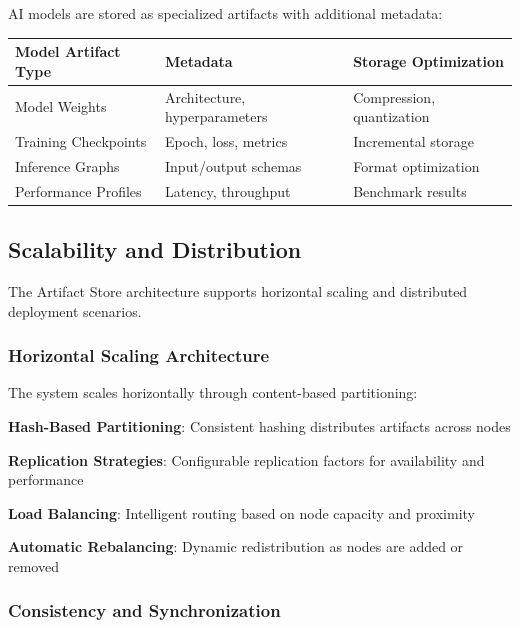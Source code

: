 AI models are stored as specialized artifacts with additional metadata:

\begin{center}
\begin{tabular}{@{}lll@{}}
\toprule
\textbf{Model Artifact Type} & \textbf{Metadata} & \textbf{Storage Optimization} \\
\midrule
Model Weights & Architecture, hyperparameters & Compression, quantization \\
Training Checkpoints & Epoch, loss, metrics & Incremental storage \\
Inference Graphs & Input/output schemas & Format optimization \\
Performance Profiles & Latency, throughput & Benchmark results \\
\bottomrule
\end{tabular}
\end{center}

\subsection*{Scalability and Distribution}

The Artifact Store architecture supports horizontal scaling and distributed deployment scenarios.

\subsubsection*{Horizontal Scaling Architecture}

The system scales horizontally through content-based partitioning:

\begin{expandedlist}
    \item \textbf{Hash-Based Partitioning}: Consistent hashing distributes artifacts across nodes
    \item \textbf{Replication Strategies}: Configurable replication factors for availability and performance
    \item \textbf{Load Balancing}: Intelligent routing based on node capacity and proximity
    \item \textbf{Automatic Rebalancing}: Dynamic redistribution as nodes are added or removed
\end{expandedlist}

\subsubsection*{Consistency and Synchronization}

